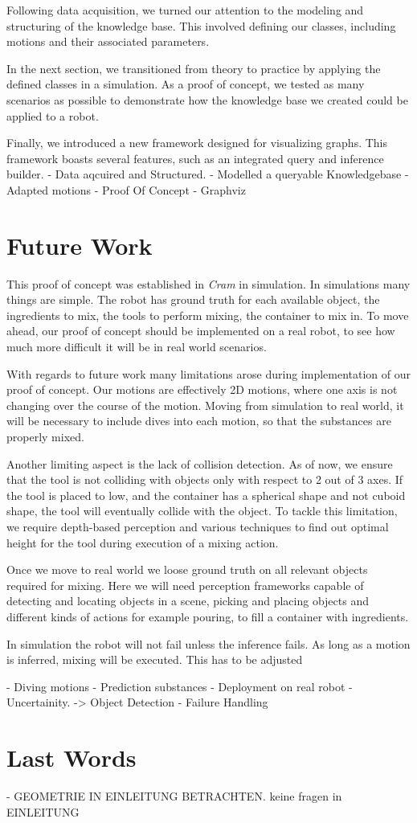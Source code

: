 Following data acquisition, we turned our attention to the modeling and structuring of the knowledge base. This involved defining our classes, including motions and their associated parameters.

In the next section, we transitioned from theory to practice by applying the defined classes in a simulation. As a proof of concept, we tested as many scenarios as possible to demonstrate how the knowledge base we created could be applied to a robot.

Finally, we introduced a new framework designed for visualizing graphs. This framework boasts several features, such as an integrated query and inference builder.
- Data aqcuired and Structured.
- Modelled a queryable Knowledgebase
- Adapted motions
- Proof Of Concept
- Graphviz
\section{Future Work}
This proof of concept was established in \textit{Cram} in simulation. In simulations many things are simple.
The robot has ground truth for each available object, the ingredients to mix, the tools to perform mixing, the container to mix in. 
To move ahead, our proof of concept should be implemented on a real robot, to see how much more difficult it will 
be in real world scenarios.

With regards to future work many limitations arose during implementation of our proof of concept.
Our motions are effectively 2D motions, where one axis is not changing over the course of the motion.
Moving from simulation to real world, it will be necessary to include dives into each motion, so that 
the substances are properly mixed. 

Another limiting aspect is the lack of collision detection. As of now, we ensure that the tool is not colliding 
with objects only with respect to 2 out of 3 axes. If the tool is placed to low, and the container has a spherical shape and not 
cuboid shape, the tool will eventually collide with the object. To tackle this limitation, we require depth-based perception
and various techniques to find out optimal height for the tool during execution of a mixing action.

Once we move to real world we loose ground truth on all relevant objects required for mixing.
Here we will need perception frameworks capable of detecting and locating objects in a scene, 
picking and placing objects and different kinds of actions for example pouring, to fill a container
with ingredients.

In simulation the robot will not fail unless the inference fails. As long as a motion is inferred, mixing will be executed.
This has to be adjusted



- Diving motions
- Prediction substances
- Deployment on real robot
- Uncertainity. -> Object Detection
- Failure Handling

\section{Last Words}

- GEOMETRIE IN EINLEITUNG BETRACHTEN.
keine fragen in EINLEITUNG